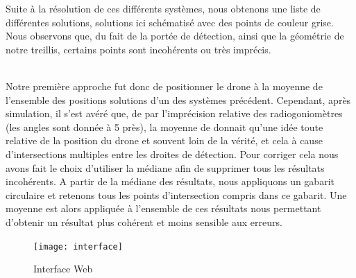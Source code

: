   Suite à la résolution de ces différents systèmes, nous
obtenons une liste de différentes solutions, solutions ici
schématisé avec des points de couleur grise. Nous observons
que, du fait de la portée de détection, ainsi que la géométrie
de notre treillis, certains points sont incohérents ou très
imprécis.

~\\
Notre première approche fut donc de positionner le drone à
la moyenne de l’ensemble des positions solutions d’un des
systèmes précédent. Cependant, après simulation, il s’est
avéré que, de par l’imprécision relative des
radiogoniomètres (les angles sont donnée à 5 près), la moyenne de donnait qu’une idée toute relative de la position du drone et souvent loin de la vérité, et
cela à cause d’intersections multiples entre les droites de détection.
Pour corriger cela nous avons fait le choix d’utiliser la médiane afin de supprimer tous les résultats
incohérents. A partir de la médiane des résultats, nous appliquons un gabarit circulaire et retenons
tous les points d’intersection compris dans ce gabarit. Une moyenne est alors appliquée à l’ensemble
de ces résultats nous permettant d’obtenir un résultat plus cohérent et moins sensible aux erreurs.



\begin{figure}[!h]
  \centering
  \texttt{[image: interface]}
  \caption{Interface Web}
  \label{fig:interface}
\end{figure}



